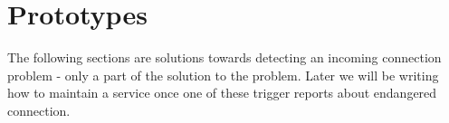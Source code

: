 \chapter{Prototypes}
\label{chap:proto}

The following sections are solutions towards detecting an incoming connection problem - only a part of the solution to the problem. Later we will be writing how to maintain a service once one of these trigger reports about endangered connection.

\newpage
\newpage
\newpage
\newpage